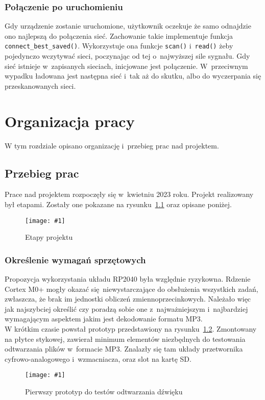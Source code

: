 \documentclass[polish]{aghengthesis}
\newcommand{\imgint}[4]{
	\begin{figure}[{#4}]
		\centering
		\texttt{[image: \#1]}
		\caption{#2}
		\label{#1}
	\end{figure}
}
\newcommand{\imgh}[3]{\imgint{#1}{#2}{#3}{H}}
\begin{document}
		\subsection{Połączenie po uruchomieniu}
			Gdy urządzenie zostanie uruchomione, użytkownik oczekuje że samo odnajdzie ono najlepszą do połączenia sieć. Zachowanie takie implementuje funkcja \lstinline|connect_best_saved()|. Wykorzystuje ona funkcje \lstinline|scan()| i~\lstinline|read()| żeby pojedynczo wczytywać sieci, poczynając od tej o~najwyższej sile sygnału. Gdy sieć istnieje w~zapisanych sieciach, inicjowane jest połączenie. W~przeciwnym wypadku ładowana jest następna sieć i~tak aż do skutku, albo do wyczerpania się przeskanowanych sieci.
			
\chapter{Organizacja pracy}
	W tym rozdziale opisano organizację i~przebieg prac nad projektem.
	
	\section{Przebieg prac}
		Prace nad projektem rozpoczęły się w~kwietniu 2023 roku. Projekt realizowany był etapami. Zostały one pokazane na rysunku~\ref{4/PicoRadio-steps} oraz opisane poniżej.
		
		\imgh{4/PicoRadio-steps}{Etapy projektu}{1}
		
		\subsection{Określenie wymagań sprzętowych}
			Propozycja wykorzystania układu RP2040 była względnie ryzykowna. Rdzenie Cortex M0+ mogły okazać się niewystarczające do obsłużenia wszystkich zadań, zwłaszcza, że brak im jednostki obliczeń zmiennoprzecinkowych. Należało więc jak najszybciej określić czy poradzą sobie one z~najważniejszym i~najbardziej wymagającym aspektem jakim jest dekodowanie formatu MP3.
			$ $\\
			
			W krótkim czasie powstał prototyp przedstawiony na rysunku~\ref{4/prototype_1}. Zmontowany na płytce stykowej, zawierał minimum elementów niezbędnych do testowania odtwarzania plików w~formacie MP3. Znalazły się tam układy przetwornika cyfrowo-analogowego i~wzmacniacza, oraz slot na kartę SD.
			
			\imgh{4/prototype_1}{Pierwszy prototyp do testów odtwarzania dźwięku}{0.6}
			
\end{document}
